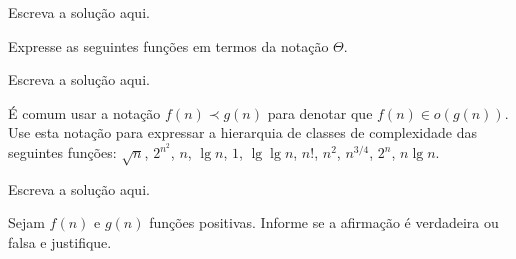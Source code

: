 \documentclass[a4paper]{exam}
\begin{document}
\begin{questions}
  \begin{solution}
    Escreva a solução aqui.
  \end{solution}
  \question Expresse as seguintes funções em termos da notação $\Theta$.
  \begin{solution}
    Escreva a solução aqui.
  \end{solution}
  \question É comum usar a notação $f(n) \prec g(n)$ para denotar que
  $f(n) \in o(g(n))$. Use esta notação para expressar a
  hierarquia de classes de complexidade das seguintes funções:
  $\sqrt{n}$, $2^{n^2}$, $n$, $\lg n$, $1$, $\lg \lg n$, $n!$, $n^2$, $n^{3/4}$, $2^n$, $n \lg n$.
  \begin{solution}
    Escreva a solução aqui.
  \end{solution}
  
  
  \question Sejam $f(n)$ e $g(n)$ funções positivas. Informe se a
  afirmação é verdadeira ou falsa e justifique.
\end{questions}
\end{document}
